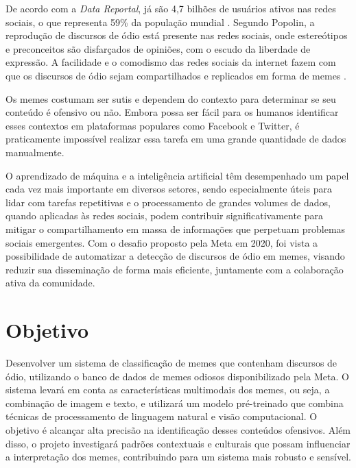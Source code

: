 De acordo com a \textit{Data Reportal}, já são 4,7 bilhões de usuários ativos nas redes sociais, o que representa 59\% da população mundial \cite{DataReportal2022}. Segundo Popolin, a reprodução de discursos de ódio está presente nas redes sociais, onde estereótipos e preconceitos são disfarçados de opiniões, com o escudo da liberdade de expressão. A facilidade e o comodismo das redes sociais da internet fazem com que os discursos de ódio sejam compartilhados e replicados em forma de memes \cite{POPOLIN2018}.

Os memes costumam ser sutis e dependem do contexto para determinar se seu conteúdo é ofensivo ou não. Embora possa ser fácil para os humanos identificar esses contextos em plataformas populares como Facebook e Twitter, é praticamente impossível realizar essa tarefa em uma grande quantidade de dados manualmente. 

O aprendizado de máquina e a inteligência artificial têm desempenhado um papel cada vez mais importante em diversos setores, sendo especialmente úteis para lidar com tarefas repetitivas e o processamento de grandes volumes de dados, quando aplicadas às redes sociais, podem contribuir significativamente para mitigar o compartilhamento em massa de informações que perpetuam problemas sociais emergentes. Com o desafio proposto pela Meta em 2020, foi vista a possibilidade de automatizar a detecção de discursos de ódio em memes, visando reduzir sua disseminação de forma mais eficiente, juntamente com a colaboração ativa da comunidade.


\section{Objetivo}


Desenvolver um sistema de classificação de memes que contenham discursos de ódio, utilizando o banco de dados de memes odiosos disponibilizado pela Meta. O sistema levará em conta as características multimodais dos memes, ou seja, a combinação de imagem e texto, e utilizará um modelo pré-treinado que combina técnicas de processamento de linguagem natural e visão computacional. O objetivo é alcançar alta precisão na identificação desses conteúdos ofensivos. Além disso, o projeto investigará padrões contextuais e culturais que possam influenciar a interpretação dos memes, contribuindo para um sistema mais robusto e sensível.



